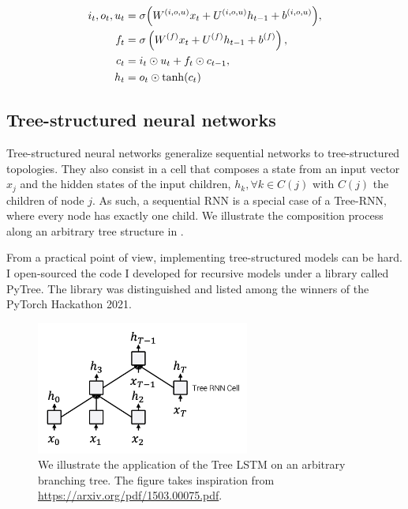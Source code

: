 \begin{align}
i_t, o_t, u_t &=\sigma \Big( W^{(i, o, u)} x_t + U^{(i, o, u)} h_{t-1} + b^{(i, o, u)} \Big), \labeq{lstm-def-first}\\
f_{t} &= \sigma\left( W^{(f)} x_t + U^{(f)} h_{t-1} + b^{(f)} \right), \labeq{lstm-def-f}\\
c_t &= i_t \odot u_t + f_{t} \odot c_{t-1}, \\
h_t &= o_t \odot \tanh(c_t) \labeq{lstm-def-last}
\end{align}

\subsection{Tree-structured neural networks}

Tree-structured neural networks generalize sequential networks to tree-structured topologies. They also consist in a cell that composes a state from an input vector $x_j$ and the hidden states of the input children, $h_k, \forall k \in C(j)$ with $C(j)$ the children of node $j$. As such, a sequential RNN is a special case of a Tree-RNN, where every node has exactly one child. We illustrate the composition process along an arbitrary tree structure in .

From a practical point of view, implementing tree-structured models can be hard. I open-sourced the code I developed for recursive models under a library called PyTree. The library was distinguished and listed among the winners of the PyTorch Hackathon 2021.

\begin{figure}[!ht]
	\includegraphics[width=7cm]{images/tree-lstm.png}
	\caption[Tree LSTM]{We illustrate the application of the Tree LSTM on an arbitrary branching tree. The figure takes inspiration from \url{https://arxiv.org/pdf/1503.00075.pdf}.}
\end{figure}

